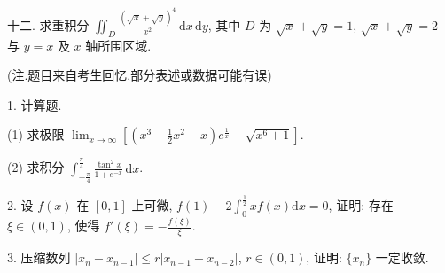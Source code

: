 \documentclass{examcollection}
\begin{document}
{\begin{minipage}{\textwidth}
十二. 求重积分 $\iint_{D} \frac{(\sqrt{x} + \sqrt{y})^4}{x^2} \, \mathrm{d}x \, \mathrm{d}y$, 其中 $D$ 为 $\sqrt{x} + \sqrt{y} = 1$, $\sqrt{x} + \sqrt{y} = 2$ 与 $y = x$ 及 $x$ 轴所围区域.\par
{}\smallskip
(注.题目来自考生回忆,部分表述或数据可能有误)\par
1. 计算题.\par
(1) 求极限 $\lim_{x\to \infty}\left[\left(x^3 -\frac{1}{2} x^2 -x\right)e^{\frac{1}{x}} - \sqrt{x^6 + 1}\right].$\par
(2) 求积分 $\int_{-\frac{\pi}{4}}^{\frac{\pi}{4}} \frac{\tan^2 x}{1 + e^{-x}} \, \mathrm{d}x$.\par
2. 设 $f(x)$ 在 $[0,1]$ 上可微, $f(1) - 2\int_{0}^{\frac{1}{2}}xf(x)\mathrm{d}x = 0$, 证明: 存在 $\xi \in (0,1)$, 使得 $f'(\xi) = -\frac{f(\xi)}{\xi}$.\par
3. 压缩数列 $|x_{n} - x_{n - 1}| \leq r|x_{n - 1} - x_{n - 2}|$, $r \in (0,1)$, 证明: $\{x_{n}\}$ 一定收敛.\par
\end{minipage}}
\ifdim\dimexpr\ht\proofbox+\dp\proofbox\relax>\textheight
\noindent\resizebox{!}{\textheight}{\usebox{\proofbox}}\else\noindent\usebox{\proofbox}\fi\clearpage
\end{document}

